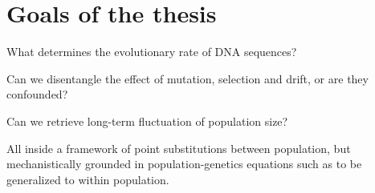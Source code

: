 \chapter{Goals of the thesis}
\minitoc
\label{sec:goals}

What determines the evolutionary rate of DNA sequences?

Can we disentangle the effect of mutation, selection and drift, or are they confounded?

Can we retrieve long-term fluctuation of population size? 

All inside a framework of point substitutions between population, but mechanistically grounded in population-genetics equations such as to be generalized to within population.